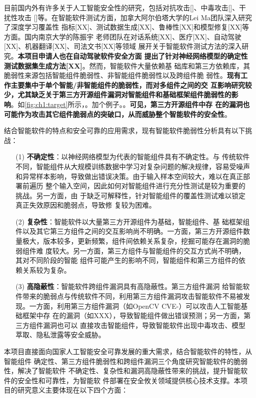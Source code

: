 目前国内外有许多关于人工智能安全性的研究，包括对抗攻击[]、中毒攻击[]、干扰性攻击
[]等。在智能软件测试方面，加拿大阿尔伯塔大学的Lei Ma团队深入研究了深度学习覆盖性
指标[XX]、测试数据生成[XX]、鲁棒性[XX]和模型修复[XX]等方面。国内南京大学的陈振宇
老师团队在对话系统[XX]、医疗[XX]、自动驾驶[XX]、机器翻译[XX]、司法文书[XX]等领域
展开关于智能软件测试方法的深入研究。\textbf{本项目申请人也在自动驾驶软件安全方面
提出了针对神经网络模型的确定性测试数据集生成方法[XX]}。然而，智能软件大量依赖基
础库和第三方依赖库，其脆弱性来源包括智能组件脆弱性、非智能组件脆弱性以及跨组件脆
弱性。\textbf{现有工作主要集中于单个智能/非智能组件的脆弱性，而对多组件之间的交
互影响研究较少，尤其缺乏关于第三方开源组件漏洞对智能组件和基础框架组件脆弱性的影
响}。如\cref{fig:ch1:target}所示，。加个例子。。\textbf{可见，第三方开源组件中存
在的漏洞也可能作为攻击其它组件脆弱点的突破口，从而威胁整个智能软件的安全性}。


结合智能软件的特点和安全可靠的应用需求，现有智能软件脆弱性分析具有以下挑战：

\begin{itemize}
    \item[(1)]\textbf{不确定性}：以神经网络模型为代表的智能组件具有不确定性。与
    传统软件不同，智能组件从大规模训练数据中学习对复杂问题的解决规律，容易受噪声
    和异常样本影响，导致做出错误决策。由于输入样本空间较大，难以在真正部署前遍历
    整个输入空间，因此如何对智能组件进行充分性测试是较为重要的挑战。另一方面，由
    于缺乏可解释性，针对智能组件的覆盖性测试难以锁定真正失效原因和脆弱点，导致修
    复较为困难。
    \item[(2)]\textbf{复杂性}：智能软件以大量第三方开源组件为基础，智能组件、基
    础框架组件以及其它第三方组件之间的交互影响尚不明确。一方面，第三方开源组件数
    量极大，版本较多，更新频繁，组件间依赖关系复杂，挖掘可能存在漏洞的脆弱组件难
    度较大。另一方面，第三方组件与智能组件的交互方式尚不明确，其对不同阶段的智能
    组件可能产生的影响不同，智能组件和第三方组件的依赖关系较为复杂。
    \item[(3)]\textbf{高隐蔽性}：智能软件跨组件漏洞具有高隐蔽性。第三方组件漏洞
    给智能软件带来的脆弱点与传统软件不同，利用第三方组件漏洞攻击智能软件不易被发
    现。一方面，利用第三方组件漏洞（如OpenCV CVE-）可以攻击人工智能基础框架中存
    在的漏洞（如XXX），导致智能组件做出错误预测；另一方面，第三方组件漏洞也可以
    直接攻击智能组件，导致智能软件出现中毒攻击、模型萃取、隐私泄露等安全威胁。
\end{itemize}


本项目直接面向国家人工智能安全可靠发展的重大需求，结合智能软件的特性，从智能组件
确定性、第三方组件脆弱性和跨组件漏洞三个角度研究智能软件的脆弱性，解决了智能软件
不确定性、复杂性和漏洞高隐蔽性带来的挑战，提升智能软件的安全性和可靠性，为智能软
件部署在安全攸关领域提供核心技术支撑。本项目的研究意义主要体现在以下四个方面：

